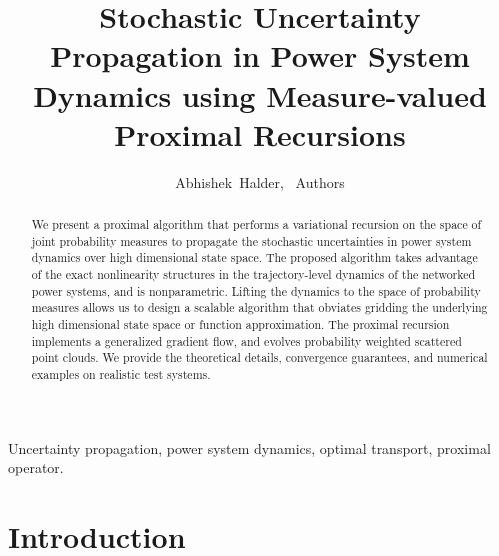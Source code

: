 \documentclass[10pt,twocolumn]{IEEEtran}
\begin{document}
\title{\LARGE \bf Stochastic Uncertainty Propagation in Power System Dynamics using Measure-valued Proximal Recursions}

\author{Abhishek~Halder,~ Authors}

\maketitle

\begin{abstract}
We present a proximal algorithm that performs a variational recursion on the space of joint probability measures to propagate the stochastic uncertainties in power system dynamics over high dimensional state space. The proposed algorithm takes advantage of the exact nonlinearity structures in the trajectory-level dynamics of the networked power systems, and is nonparametric. Lifting the dynamics to the space of probability measures allows us to design a scalable algorithm that obviates gridding the underlying high dimensional state space or function approximation. The proximal recursion implements a generalized gradient flow, and evolves probability weighted scattered point clouds. We provide the theoretical details, convergence guarantees, and numerical examples on realistic test systems.
\end{abstract}

\begin{IEEEkeywords}
Uncertainty propagation, power system dynamics, optimal transport, proximal operator.
\end{IEEEkeywords}



\section{Introduction}\label{sec:intro}
\end{document}
